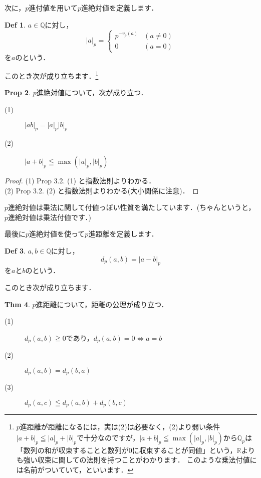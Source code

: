\documentclass[./main]{subfiles}
\theoremstyle{definition}
\newtheorem{theo}{Thm}[section]
\newtheorem{defi}[theo]{Def}
\newtheorem{prop}[theo]{Prop}
\newcommand{\Q}{\mathbb{Q}}%
\newcommand{\Qp}{\mathbb{Q}_p}%
\newcommand{\R}{\mathbb{R}}%
\newcommand{\abs}[1]{\left\lvert#1\right\rvert}%
\begin{document}
次に，$p$進付値を用いて$p$進絶対値を定義します．

\begin{defi}
$a \in \Q$に対し，
\begin{equation*}
\abs{a}_p= \begin{cases}
	p^{-v_p(a)} &(a \neq 0)\\
	0 &(a=0)
	\end{cases}
\end{equation*}
を$a$のという．
\end{defi}

このとき次が成り立ちます．\footnote{$p$進距離が距離になるには，実は(2)は必要なく，(2)より弱い条件$\abs{a+b}_p \leqq \abs{a}_p+\abs{b}_p$で十分なのですが，$\abs{a+b}_p \leqq \max(\abs{a}_p,\abs{b}_p)$から$\Qp$は「数列の和が収束することと数列が0に収束することが同値」という，$\R$よりも強い収束に関しての法則を持つことがわかります．
このような乗法付値には名前がついていて，といいます．}
\begin{prop}
$p$進絶対値について，次が成り立つ．
\begin{description}
	\item[(1)] $\abs{ab}_p=\abs{a}_p \abs{b}_p$
	\item[(2)] $\abs{a+b}_p \leqq \max(\abs{a}_p,\abs{b}_p)$
\end{description}
\end{prop}

\begin{proof}
	(1) Prop 3.2. (1) と指数法則よりわかる．\\
	(2) Prop 3.2. (2) と指数法則よりわかる(大小関係に注意)．
\end{proof}


$p$進絶対値は乗法に関して付値っぽい性質を満たしています．(ちゃんというと，$p$進絶対値は乗法付値です．)

最後に$p$進絶対値を使って$p$進距離を定義します．

\begin{defi}
$a,b \in \Q$に対し，
\begin{equation*}
d_p(a,b)=\abs{a-b}_p
\end{equation*}
を$a$と$b$のという．
\end{defi}

このとき次が成り立ちます．
\begin{theo}
$p$進距離について，距離の公理が成り立つ．
\begin{description}
	\item[(1)] $d_p(a,b) \geqq	0$であり，$d_p(a,b)=0 \Longleftrightarrow a=b$ 
	\item[(2)] $d_p(a,b)=d_p(b,a)$ 
	\item[(3)] $d_p(a,c) \leqq d_p(a,b) +d_p(b,c)$
\end{description}
\end{theo}
\end{document}
